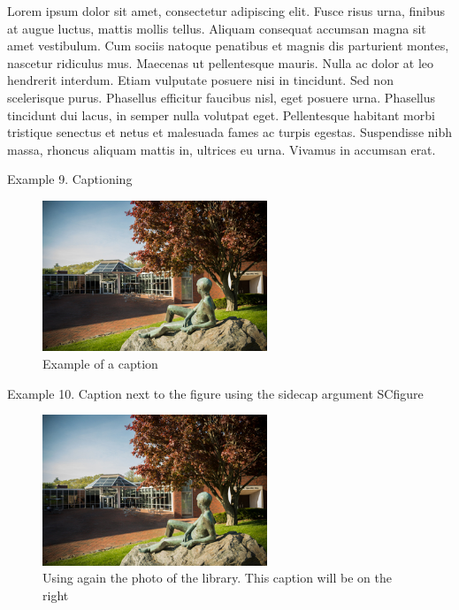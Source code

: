 \documentclass{article}
\begin{document}
\vspace{1.2cm}

Lorem ipsum dolor sit amet, consectetur adipiscing elit. Fusce risus 
urna, finibus at augue luctus, mattis mollis tellus. Aliquam consequat 
accumsan magna sit amet vestibulum. Cum sociis natoque penatibus et 
magnis dis parturient montes, nascetur ridiculus mus. Maecenas ut 
pellentesque mauris. Nulla ac dolor at leo hendrerit interdum. Etiam 
vulputate posuere nisi in tincidunt. Sed non scelerisque purus. Phasellus 
efficitur faucibus nisl, eget posuere urna. Phasellus tincidunt dui 
lacus, in semper nulla volutpat eget. Pellentesque habitant morbi 
tristique senectus et netus et malesuada fames ac turpis egestas. 
Suspendisse nibh massa, rhoncus aliquam mattis in, ultrices eu urna. 
Vivamus in accumsan erat.

\newpage


Example 9. Captioning

\begin{figure}[h]
\caption{Example of a caption}
\centering
\includegraphics[width=0.6\textwidth]{library}
\end{figure}


\vspace{1.5cm}

Example 10. Caption next to the figure using the sidecap argument SCfigure
\begin{figure}
\caption{Using again the photo of the library. 
         This caption will be on the right}
\includegraphics[width=0.6\textwidth]{library}
\end{figure}
\end{document}
